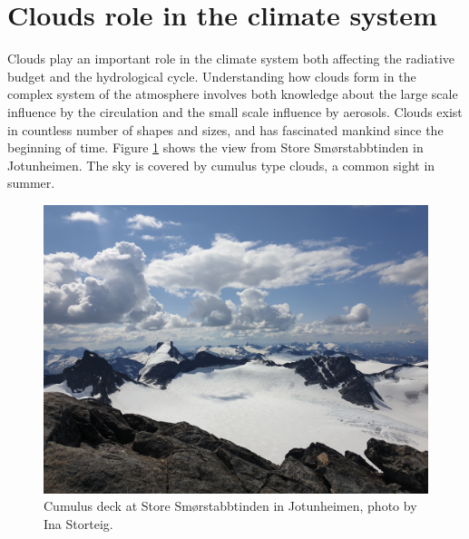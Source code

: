 \section{Clouds role in the climate system} \label{sec:cloud_in_climate_system}
Clouds play an important role in the climate system both affecting the radiative budget and the hydrological cycle. Understanding how clouds form in the complex system of the atmosphere involves both knowledge about the large scale influence by the circulation and the small scale influence by aerosols. Clouds exist in countless number of shapes and sizes, and has fascinated mankind since the beginning of time. Figure \ref{fig:cloud_cover_jotunheimen} shows the view from Store Smørstabbtinden in Jotunheimen. The sky is covered by cumulus type clouds, a common sight in summer.
\begin{figure}
    \centering
    \includegraphics[scale=0.1]{Chapter1_Intro/images/cloud_cover_ina.jpg}
    \caption[Cumulus deck at Store Smørstabbtinden in Jotunheimen]{Cumulus deck at Store Smørstabbtinden in Jotunheimen, photo by Ina Storteig.}
    \label{fig:cloud_cover_jotunheimen}
\end{figure}

